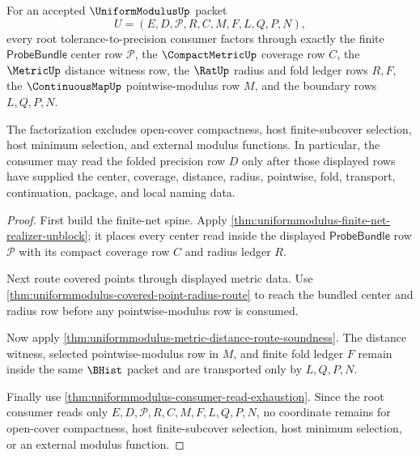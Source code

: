 \begin{theorem}
\label{thm:uniform-modulus-root-finite-net-budget-factorization}
For an accepted $\UniformModulusUp$ packet
$$
U=(E,D,\mathcal{P},R,C,M,F,L,Q,P,N),
$$
every root tolerance-to-precision consumer factors through exactly the finite $\mathsf{ProbeBundle}$ center row $\mathcal{P}$, the $\CompactMetricUp$ coverage row $C$, the $\MetricUp$ distance witness row, the $\RatUp$ radius and fold ledger rows $R,F$, the $\ContinuousMapUp$ pointwise-modulus row $M$, and the boundary rows $L,Q,P,N$.

The factorization excludes open-cover compactness, host finite-subcover selection, host minimum selection, and external modulus functions. In particular, the consumer may read the folded precision row $D$ only after those displayed rows have supplied the center, coverage, distance, radius, pointwise, fold, transport, continuation, package, and local naming data.
\end{theorem}
\begin{proof}
First build the finite-net spine. Apply \autoref{thm:uniformmodulus-finite-net-realizer-unblock}; it places every center read inside the displayed $\mathsf{ProbeBundle}$ row $\mathcal{P}$ with its compact coverage row $C$ and radius ledger $R$.

Next route covered points through displayed metric data. Use \autoref{thm:uniformmodulus-covered-point-radius-route} to reach the bundled center and radius row before any pointwise-modulus row is consumed.

Now apply \autoref{thm:uniformmodulus-metric-distance-route-soundness}. The distance witness, selected pointwise-modulus row in $M$, and finite fold ledger $F$ remain inside the same $\BHist$ packet and are transported only by $L,Q,P,N$.

Finally use \autoref{thm:uniformmodulus-consumer-read-exhaustion}. Since the root consumer reads only $E,D,\mathcal{P},R,C,M,F,L,Q,P,N$, no coordinate remains for open-cover compactness, host finite-subcover selection, host minimum selection, or an external modulus function.
\end{proof}

